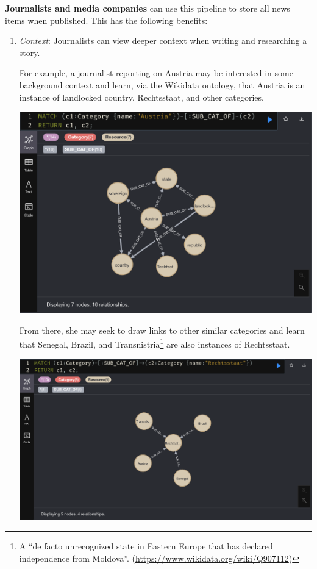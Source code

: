 \documentclass[11pt]{article}
\begin{document}
\textbf{Journalists and media companies} can use this pipeline to store all news items when published. This has the following benefits:
\begin{enumerate}
  \item{
    \textit{Context}: Journalists can view deeper context when writing and researching a story.

    For example, a journalist reporting on Austria may be interested in some background context and learn, via the Wikidata ontology, that Austria is an instance of landlocked country, Rechtsstaat, and other categories.
  
    \centerline{\includegraphics[scale=0.3]{use-case-1a}}

    From there, she may seek to draw links to other similar categories and learn that Senegal, Brazil, and Transnistria\footnote{A ``de facto unrecognized state in Eastern Europe that has declared independence from Moldova''. (\url{https://www.wikidata.org/wiki/Q907112})} are also instances of Rechtsstaat.
  
    \centerline{\includegraphics[scale=0.3]{use-case-1b}}

}
\end{enumerate}
\end{document}
